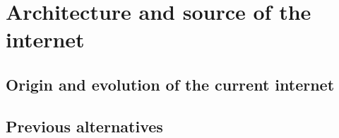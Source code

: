 % 
%
%
%
%
%
%
%
%
%

\chapter{Architecture and source of the internet}

\section{Origin and evolution of the current internet}
\section{Previous alternatives}
